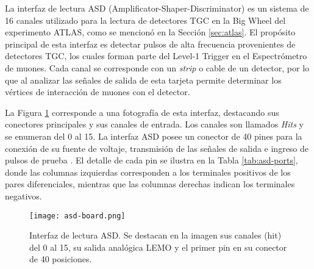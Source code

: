 La interfaz de lectura ASD (Amplificator-Shaper-Discriminator)\cite{1999ATLASICs} es un sistema de 16 canales utilizado para la lectura de detectores TGC en la Big Wheel del experimento ATLAS, como se mencionó en la Sección \ref{sec:atlas}. El propósito principal de esta interfaz es detectar pulsos de alta frecuencia provenientes de detectores TGC, los cuales forman parte del Level-1 Trigger en el Espectrómetro de muones. Cada canal se corresponde con un \textit{strip} o cable de un detector, por lo que al analizar las señales de salida de esta tarjeta permite determinar los vértices de interacción  de muones con el detector.

La Figura \ref{img:asd-board} corresponde a una fotografía de esta interfaz, destacando sus conectores principales y sus canales de entrada. Los canales son llamados \textit{Hits} y se enumeran del 0 al 15. La interfaz ASD posee  un conector de 40 pines para la conexión de su fuente de voltaje, transmisión de las señales de salida  e ingreso de pulsos de prueba . El detalle de cada pin se ilustra en la Tabla \ref{tab:asd-ports}, donde las columnas izquierdas corresponden a los terminales positivos de los pares diferenciales, mientras que las columnas derechas indican los terminales negativos.  

\begin{figure}[h]
	\centering
	\texttt{[image: asd-board.png]}
	\caption{Interfaz de lectura ASD. Se destacan en la imagen sus canales (hit) del 0 al 15, su salida analógica LEMO y el primer pin en su conector de 40 posiciones.}
	\label{img:asd-board}
\end{figure}

